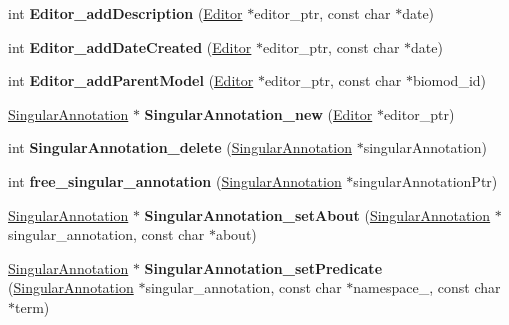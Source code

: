 \begin{DoxyCompactItemize}
\mbox{\label{namespaceomexmeta_a117e6430247224600755a3c3bffb0632}} 
int {\bfseries Editor\+\_\+add\+Description} (\hyperlink{classomexmeta_1_1Editor}{Editor} $\ast$editor\+\_\+ptr, const char $\ast$date)
\item 
\mbox{\label{namespaceomexmeta_a438d94f9c2af78f41cfb28d92da25bd5}} 
int {\bfseries Editor\+\_\+add\+Date\+Created} (\hyperlink{classomexmeta_1_1Editor}{Editor} $\ast$editor\+\_\+ptr, const char $\ast$date)
\item 
\mbox{\label{namespaceomexmeta_a6bd3edcdc8e62d3da2ff9328280e2612}} 
int {\bfseries Editor\+\_\+add\+Parent\+Model} (\hyperlink{classomexmeta_1_1Editor}{Editor} $\ast$editor\+\_\+ptr, const char $\ast$biomod\+\_\+id)
\item 
\mbox{\label{namespaceomexmeta_a56234965820e6e731cb377af949585a3}} 
\hyperlink{classomexmeta_1_1Triple}{Singular\+Annotation} $\ast$ {\bfseries Singular\+Annotation\+\_\+new} (\hyperlink{classomexmeta_1_1Editor}{Editor} $\ast$editor\+\_\+ptr)
\item 
\mbox{\label{namespaceomexmeta_a6c1d37ce851c1853f83a3622a5bd00bc}} 
int {\bfseries Singular\+Annotation\+\_\+delete} (\hyperlink{classomexmeta_1_1Triple}{Singular\+Annotation} $\ast$singular\+Annotation)
\item 
\mbox{\label{namespaceomexmeta_ad8b1a3d657ffffadcef2d723044c18e9}} 
int {\bfseries free\+\_\+singular\+\_\+annotation} (\hyperlink{classomexmeta_1_1Triple}{Singular\+Annotation} $\ast$singular\+Annotation\+Ptr)
\item 
\mbox{\label{namespaceomexmeta_aba899b6a9b09d4d747dae983ead4eb3c}} 
\hyperlink{classomexmeta_1_1Triple}{Singular\+Annotation} $\ast$ {\bfseries Singular\+Annotation\+\_\+set\+About} (\hyperlink{classomexmeta_1_1Triple}{Singular\+Annotation} $\ast$singular\+\_\+annotation, const char $\ast$about)
\item 
\mbox{\label{namespaceomexmeta_aeedfc49054398f038e3e5dc431463ccd}} 
\hyperlink{classomexmeta_1_1Triple}{Singular\+Annotation} $\ast$ {\bfseries Singular\+Annotation\+\_\+set\+Predicate} (\hyperlink{classomexmeta_1_1Triple}{Singular\+Annotation} $\ast$singular\+\_\+annotation, const char $\ast$namespace\+\_\+, const char $\ast$term)

\end{DoxyCompactItemize}
